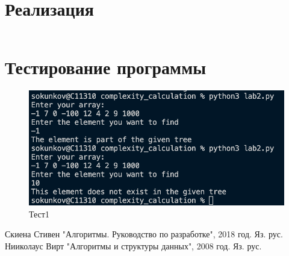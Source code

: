 \documentclass[spec, och, labwork]{shiza}
\begin{document}
\section{Реализация}

    \inputminted[fontsize=\small]{py}{lab2.py}

    \section{Тестирование программы}

    \begin{figure}[H]
        \centering      %
        \includegraphics[width=1.\textwidth]{2}
        \caption{Тест1}
        \label{fig:image1}
    \end{figure}
    
    \newpage
    
    \begin{thebibliography}{3}
        Скиена Стивен "Алгоритмы. Руководство по разработке", 2018 год. Яз. рус.
        Нииколаус Вирт "Алгоритмы и структуры данных", 2008 год. Яз. рус.
    \end{thebibliography}
\end{document}
